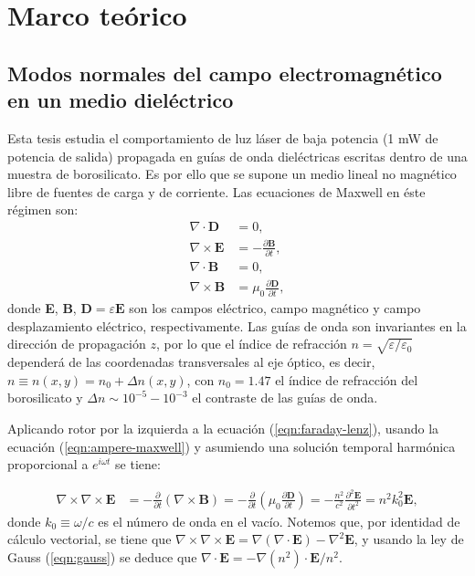 \chapter{Marco teórico}

\section{Modos normales del campo electromagnético en un medio dieléctrico}

Esta tesis estudia el comportamiento de luz láser de baja potencia (1 mW de potencia de salida) propagada en guías de onda dieléctricas escritas dentro de una muestra de borosilicato. Es por ello que se supone un medio lineal no magnético libre de fuentes de carga y de corriente. Las ecuaciones de Maxwell en éste régimen son:
\begin{align}
	\nabla\cdot\textbf{D} &= 0, \label{eqn:gauss}
	\\	
	\nabla\times\textbf{E} &= -\frac{\partial \textbf{B}}{\partial t}, \label{eqn:faraday-lenz}
	\\	
	\nabla\cdot\textbf{B} &= 0,
	\\	
	\nabla\times\textbf{B} &= \mu_0\frac{\partial \textbf{D}}{\partial t}, \label{eqn:ampere-maxwell}
\end{align}
donde \textbf{E}, \textbf{B}, $\textbf{D}=\varepsilon\textbf{E}$ son los campos eléctrico, campo magnético y campo desplazamiento eléctrico, respectivamente. Las guías de onda son invariantes en la dirección de propagación $z$, por lo que el índice de refracción $n=\sqrt{\varepsilon/\varepsilon_0}$ dependerá de las coordenadas transversales al eje óptico, es decir, $n \equiv n(x,y) = n_0 + \Delta n(x,y)$, con $n_0=1.47$ el índice de refracción del borosilicato y $\Delta n \sim 10^{-5}-10^{-3}$ el contraste de las guías de onda.

Aplicando rotor por la izquierda a la ecuación (\ref{eqn:faraday-lenz}), usando la ecuación (\ref{eqn:ampere-maxwell}) y asumiendo una solución temporal harmónica proporcional a $e^{i\omega t}$ se tiene:

\begin{align}
	\nabla\times\nabla\times\textbf{E} &= -\frac{\partial}{\partial t}(\nabla\times\textbf{B}) = -\frac{\partial}{\partial t}\left(\mu_0\frac{\partial \textbf{D}}{\partial t}\right) = -\frac{n^2}{c^2}\frac{\partial^2 \textbf{E}}{\partial t^2} = n^2k_0^2 \textbf{E}, \label{eqn:rotordoble}
\end{align}
donde $k_0 \equiv \omega/c$ es el número de onda en el vacío. Notemos que, por identidad de cálculo vectorial, se tiene que $\nabla\times\nabla\times\textbf{E} = \nabla(\nabla\cdot\textbf{E}) - \nabla^2\textbf{E}$, y usando la ley de Gauss (\ref{eqn:gauss}) se deduce que $\nabla\cdot \textbf{E} = -\nabla(n^2)\cdot\textbf{E}/n^2$.

